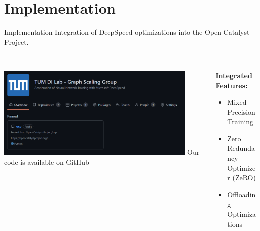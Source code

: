 \section{Implementation}

\begin{frame}{Implementation}
    Integration of DeepSpeed optimizations into the Open Catalyst Project. \\~\\ 

    \begin{columns}
        \centering
        \begin{column}{0.5\textwidth}
            \centering
            \includegraphics[width=0.9\textwidth]{figures/ocp-branch.png}
            Our code is available on GitHub\footnotemark
        \end{column} 

        \begin{column}{0.5\textwidth}
            \textbf{Integrated Features:}

            \begin{itemize}
                \item \textcolor{tum-green}{} Mixed-Precision Training
                \item \textcolor{tum-green}{} Zero Redundancy Optimizer (ZeRO)
                \item \textcolor{tum-green}{} Offloading Optimizations
            \end{itemize}
        \end{column} 
    \end{columns}
\end{frame}

